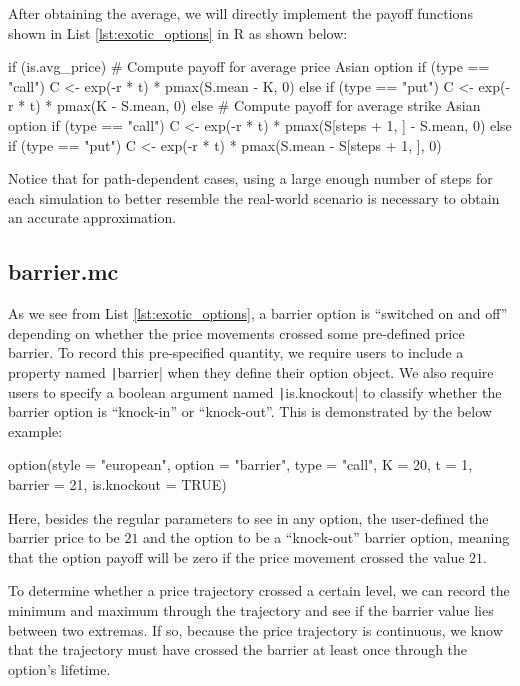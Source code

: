 After obtaining the average, we will directly implement the payoff functions shown in List \ref{lst:exotic_options} in R as shown below:

\begin{Rminted}
if (is.avg_price) { # Compute payoff for average price Asian option
    if (type == "call") {
        C <- exp(-r * t) * pmax(S.mean - K, 0)
    } else if (type == "put") {
        C <- exp(-r * t) * pmax(K - S.mean, 0)
    }
} else { # Compute payoff for average strike Asian option
    if (type == "call") {
        C <- exp(-r * t) * pmax(S[steps + 1, ] - S.mean, 0)
    } else if (type == "put") {
        C <- exp(-r * t) * pmax(S.mean - S[steps + 1, ], 0)
    }
}
\end{Rminted}

Notice that for path-dependent cases, using a large enough number of steps for each simulation to better resemble the real-world scenario is necessary to obtain an accurate approximation.

\subsection{barrier.mc}

As we see from List \ref{lst:exotic_options}, a barrier option is ``switched on and off'' depending on whether the price movements crossed some pre-defined price barrier. To record this pre-specified quantity, we require users to include a property named \texttt|barrier| when they define their option object. We also require users to specify a boolean argument named \texttt|is.knockout| to classify whether the barrier option is ``knock-in'' or ``knock-out''. This is demonstrated by the below example:

\begin{Rminted}
option(style = "european", option = "barrier", type = "call", K = 20, t = 1, barrier = 21, is.knockout = TRUE)
\end{Rminted}

Here, besides the regular parameters to see in any option, the user-defined the barrier price to be $21$ and the option to be a ``knock-out'' barrier option, meaning that the option payoff will be zero if the price movement crossed the value $21$.

To determine whether a price trajectory crossed a certain level, we can record the minimum and maximum through the trajectory and see if the barrier value lies between two extremas. If so, because the price trajectory is continuous, we know that the trajectory must have crossed the barrier at least once through the option's lifetime.

